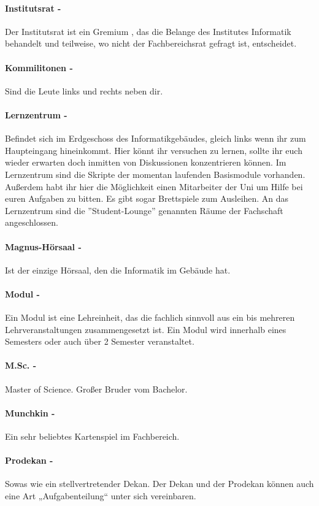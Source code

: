 \paragraph{Institutsrat -} Der Institutsrat ist ein Gremium , das die Belange des Institutes Informatik behandelt und teilweise, wo nicht der Fachbereichsrat gefragt ist, entscheidet.
\paragraph{Kommilitonen -} Sind die Leute links und rechts neben dir.
\paragraph{Lernzentrum -}  Befindet sich im Erdgeschoss des Informatikgebäudes, gleich links wenn ihr zum Haupteingang hineinkommt. Hier könnt ihr versuchen zu lernen, sollte ihr euch wieder erwarten doch inmitten von Diskussionen konzentrieren können. Im Lernzentrum sind die Skripte der momentan laufenden Basismodule vorhanden. Außerdem habt ihr hier die Möglichkeit einen Mitarbeiter der Uni um Hilfe bei euren Aufgaben zu bitten. Es gibt sogar Brettspiele zum Ausleihen. An das Lernzentrum sind die ''Student-Lounge'' genannten Räume der Fachschaft angeschlossen.
\paragraph{Magnus-Hörsaal -} Ist der einzige Hörsaal, den die Informatik im Gebäude hat.
\paragraph{Modul -} Ein Modul ist eine Lehreinheit, das die fachlich sinnvoll aus ein bis mehreren Lehrveranstaltungen zusammengesetzt ist. Ein Modul wird innerhalb eines Semesters oder auch über 2 Semester veranstaltet.
\paragraph{M.Sc. -} \glqq Master of Science\grqq . Großer Bruder vom Bachelor.
\paragraph{Munchkin -} Ein sehr beliebtes Kartenspiel im Fachbereich. 
\paragraph{Prodekan -} Sowas wie ein stellvertretender Dekan. Der Dekan und der Prodekan können auch eine Art „Aufgabenteilung“ unter sich vereinbaren.
